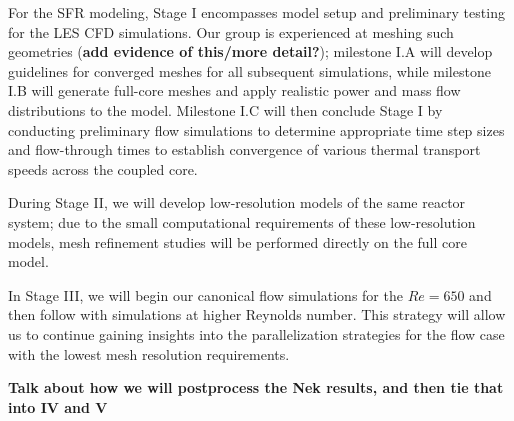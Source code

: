 For the SFR modeling, Stage I encompasses model setup and preliminary testing for
the LES CFD simulations. Our group is experienced at meshing such geometries ({\bf add evidence of this/more detail?}); milestone
I.A will develop guidelines for converged meshes for all subsequent simulations, while milestone
I.B will generate full-core meshes and apply realistic power and mass flow distributions to the model.
Milestone I.C will then conclude Stage I by conducting preliminary flow simulations to
determine appropriate time step sizes and flow-through times to establish convergence
of various thermal transport speeds across the coupled core.

During Stage II, we will develop low-resolution models of the same reactor system;
due to the small computational requirements of these low-resolution models, mesh
refinement studies will be performed directly on the full core model.

In Stage III, we will begin our canonical flow simulations for the \(Re=650\) and then
follow with simulations at higher Reynolds number. This strategy will allow us to
continue gaining insights into the parallelization strategies for the flow case with the
lowest mesh resolution requirements.

{\bf Talk about how we will postprocess the Nek results, and then tie that into IV and V}



